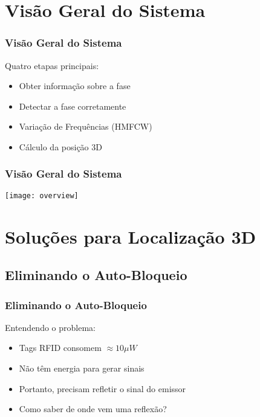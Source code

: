 
\section{Visão Geral do Sistema}

\begin{frame}
    \frametitle{Visão Geral do Sistema}

    Quatro etapas principais:

    \begin{itemize}
        \item Obter \alert{informação sobre a fase}
        \item \alert{Detectar a fase} corretamente
        \item \alert{Variação de Frequências} (HMFCW)
        \item \alert{Cálculo da posição 3D}
    \end{itemize}
\end{frame}

\begin{frame}
    \frametitle{Visão Geral do Sistema}

    \begin{center}
        \texttt{[image: overview]}
    \end{center}
\end{frame}

\section{Soluções para Localização 3D}

\subsection{Eliminando o Auto-Bloqueio}

\begin{frame}
    \frametitle{Eliminando o Auto-Bloqueio}

    Entendendo o problema:
    \begin{itemize}
        \item Tags RFID consomem \alert{$\approx{}10\mu{}W$}
        \item Não têm energia para \alert{gerar sinais}
        \item Portanto, precisam \alert{refletir o sinal do emissor}
            \pause
        \item \alert{Como saber de onde vem uma reflexão?}
    \end{itemize}
\end{frame}

